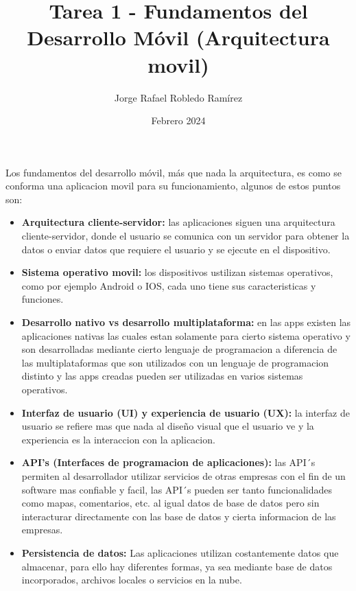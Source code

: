 \documentclass{article}
\title{Tarea 1 - Fundamentos del Desarrollo Móvil (Arquitectura movil)}
\author{Jorge Rafael Robledo Ramírez}
\date{Febrero 2024}
\begin{document}
\maketitle

Los fundamentos del desarrollo móvil, más que nada la arquitectura, es como se conforma una aplicacion movil para su funcionamiento, algunos de estos puntos son:

\begin{itemize}
    \item \textbf{Arquitectura cliente-servidor:} las aplicaciones siguen una arquitectura cliente-servidor, donde el usuario se comunica con un servidor para obtener la datos o enviar datos que requiere el usuario y se ejecute en el dispositivo.

    \item \textbf{Sistema operativo movil:} los dispositivos ustilizan sistemas operativos, como por ejemplo Android o IOS, cada uno tiene sus caracteristicas y funciones.

    \item \textbf{Desarrollo nativo vs desarrollo multiplataforma:} en las apps existen las aplicaciones nativas las cuales estan solamente para cierto sistema operativo y son desarrolladas mediante cierto lenguaje de programacion a diferencia de las multiplataformas que son utilizados con un lenguaje de programacion distinto y las apps creadas pueden ser utilizadas en varios sistemas operativos.

    \item \textbf{Interfaz de usuario (UI) y experiencia de usuario (UX):} la interfaz de usuario se refiere mas que nada al diseño visual que el usuario ve y la experiencia es la interaccion con la aplicacion.

    \item \textbf{API's (Interfaces de programacion de aplicaciones):} las API´s permiten al desarrollador utilizar servicios de otras empresas con el fin de un software mas confiable y facil, las API´s pueden ser tanto funcionalidades como mapas, comentarios, etc. al igual datos de base de datos pero sin interacturar directamente con las base de datos y cierta informacion de las empresas.

    \item \textbf{Persistencia de datos:} Las aplicaciones utilizan costantemente datos que almacenar, para ello hay diferentes formas, ya sea mediante base de datos incorporados, archivos locales o servicios en la nube.


\end{itemize}
\end{document}
